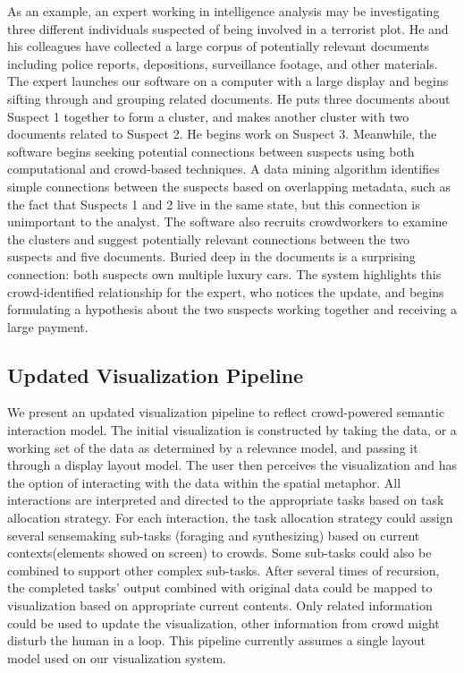 \documentclass[journal]{vgtc}                %
\begin{document}
As an example, an expert working in intelligence analysis may be investigating three different individuals suspected of being involved in a terrorist plot.
He and his colleagues have collected a large corpus of potentially relevant documents including police reports, depositions, surveillance footage, and other materials.
The expert launches our software on a computer with a large display and begins sifting through and grouping related documents.
He puts three documents about Suspect 1 together to form a cluster, and makes another cluster with two documents related to Suspect 2.
He begins work on Suspect 3.
Meanwhile, the software begins seeking potential connections between suspects using both computational and crowd-based techniques.
A data mining algorithm identifies simple connections between the suspects based on overlapping metadata, such as the fact that Suspects 1 and 2 live in the same state, but this connection is unimportant to the analyst.
The software also recruits crowdworkers to examine the clusters and suggest potentially relevant connections between the two suspects and five documents.
Buried deep in the documents is a surprising connection: both suspects own multiple luxury cars.
The system highlights this crowd-identified relationship for the expert, who notices the update, and begins formulating a hypothesis about the two suspects working together and receiving a large payment.


\subsection{Updated Visualization Pipeline}


We present an updated visualization pipeline to reflect crowd-powered semantic interaction model.
The initial visualization is constructed by taking the data, or a working set of the data as determined by a relevance model, and passing it through a display layout model.
The user then perceives the visualization and has the option of interacting with the data within the spatial metaphor.
All interactions are interpreted and directed to the appropriate tasks based on task allocation strategy.
For each interaction, the task allocation strategy could assign several sensemaking sub-tasks (foraging and synthesizing) based on current contexts(elements showed on screen) to crowds. Some sub-tasks could also be combined to support other complex sub-tasks.
After several times of recursion, the completed tasks' output combined with original data could be mapped to visualization based on appropriate current contents. Only related information could be used to update the visualization, other information from crowd might disturb the human in a loop. This pipeline currently assumes a single layout model used on our visualization system.
\end{document}
